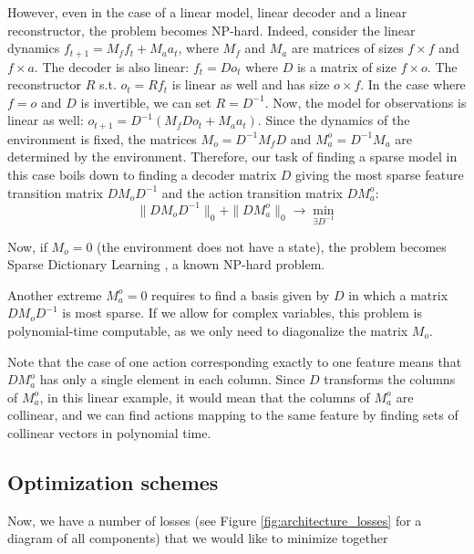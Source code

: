\documentclass[a4paper,11pt,oneside]{report}
\begin{document}
However, even in the case of a linear model, linear decoder and a linear reconstructor, the problem becomes NP-hard. Indeed, consider the linear dynamics $f_{t+1}=M_ff_t+M_aa_t$, where $M_f$ and $M_a$ are matrices of sizes $f\times f$ and $f\times a$. The decoder is also linear: $f_t=Do_t$ where $D$ is a matrix of size $f\times o$. The reconstructor $R$ s.t. $o_t=Rf_t$ is linear as well and has size $o\times f$. In the case where $f=o$ and $D$ is invertible, we can set $R=D^{-1}$. Now, the model for observations is linear as well: $o_{t+1}=D^{-1}\left(M_fDo_t+M_aa_t\right)$. Since the dynamics of the environment is fixed, the matrices $M_o=D^{-1}M_fD$ and $M_a^{o}=D^{-1}M_a$ are determined by the environment. Therefore, our task of finding a sparse model in this case boils down to finding a decoder matrix $D$ giving the most sparse feature transition matrix $DM_oD^{-1}$ and the action transition matrix $DM_a^{o}$:
$$
\|DM_oD^{-1}\|_0+\|DM_a^{o}\|_0\to\min\limits_{\exists D^{-1}}
$$

Now, if $M_o=0$ (the environment does not have a state), the problem becomes Sparse Dictionary Learning \cite{Vincent2002}, a known NP-hard problem.

Another extreme $M_a^o=0$ requires to find a basis given by $D$ in which a matrix $DM_oD^{-1}$ is most sparse. If we allow for complex variables, this problem is polynomial-time computable, as we only need to diagonalize the matrix $M_o$.

Note that the case of one action corresponding exactly to one feature \cite{Thomas2018,Corneil2018} means that $DM_a^o$ has only a single element in each column. Since $D$ transforms the columns of $M_a^o$, in this linear example, it would mean that the columns of $M_a^o$ are collinear, and we can find actions mapping to the same feature by finding sets of collinear vectors in polynomial time.

\subsection{Optimization schemes}
Now, we have a number of losses (see Figure \ref{fig:architecture_losses} for a diagram of all components) that we would like to minimize together
\end{document}

